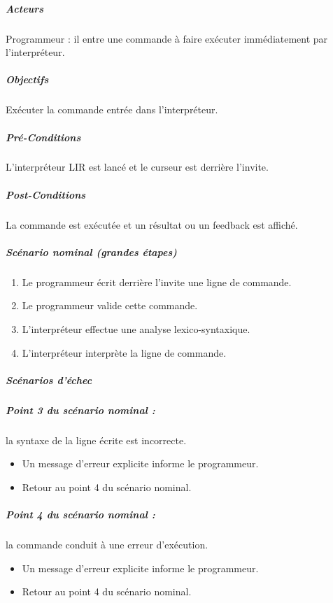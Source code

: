     \subparagraph{Acteurs}
    Programmeur : il entre une commande à faire exécuter immédiatement par l'interpréteur.

    \subparagraph{Objectifs}
    Exécuter la commande entrée dans l'interpréteur.

    \subparagraph{Pré-Conditions}
    L'interpréteur LIR est lancé et le curseur est derrière l'invite.

    \subparagraph{Post-Conditions}
    La commande est exécutée et un résultat ou un feedback est affiché.

    \subparagraph{Scénario nominal (grandes étapes)}
        \begin{enumerate}
            \item Le programmeur écrit derrière l'invite une ligne de commande.
            \item Le programmeur valide cette commande.
            \item L'interpréteur effectue une analyse lexico-syntaxique.
            \item L'interpréteur interprète la ligne de commande.
        \end{enumerate}

    \subparagraph{Scénarios d'échec}
        \subparagraph{Point 3 du scénario nominal :} la syntaxe de la ligne écrite est incorrecte.
        \begin{itemize}
            \item Un message d'erreur explicite informe le programmeur.
            \item Retour au point 4 du scénario nominal.
        \end{itemize}

        \subparagraph{Point 4 du scénario nominal :} la commande conduit à une erreur d'exécution.
        \begin{itemize}
            \item Un message d'erreur explicite informe le programmeur.
            \item Retour au point 4 du scénario nominal.
        \end{itemize}

%